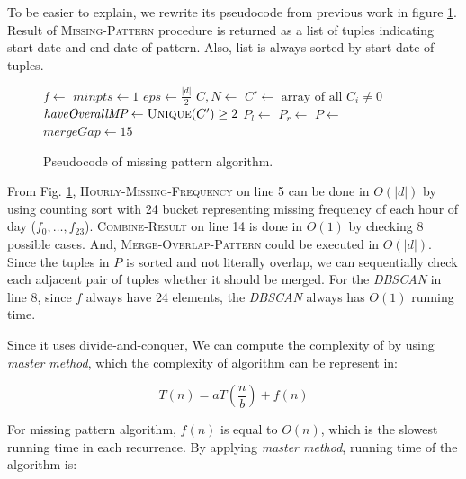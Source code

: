 \documentclass[conference]{IEEEtran}
\begin{document}
To be easier to explain, we rewrite its pseudocode from previous work in figure \ref{fig:missingpattern_pseudocode}. Result of \textsc{Missing-Pattern} procedure is returned as a list of tuples indicating start date and end date of pattern. Also, list is always sorted by start date of tuples.

\begin{figure}
\begin{algorithmic}[1]
\State\Return{$\emptyset$}
\EndIf
\State $f \gets$ 
\State $minpts \gets 1$
\State $eps \gets \frac{|d|}{2}$
\State $C, N \gets$ 
\State $C' \gets \text{ array of all } C_{i} \neq 0$
\State $\textit{haveOverallMP} \gets \Call{Unique}{C'} \ge 2$ 
\State
\State $P_{l} \gets $
\State $P_{r} \gets$ 
\State $P \gets$ 
\State
\State $\textit{mergeGap} \gets 15$ 
\State {}
\EndProcedure
\end{algorithmic}
\caption{Pseudocode of missing pattern algorithm.}
\label{fig:missingpattern_pseudocode}
\end{figure}

From Fig. \ref{fig:missingpattern_pseudocode}, \textsc{Hourly-Missing-Frequency} on line 5 can be done in $O(|d|)$ by using counting sort with 24 bucket representing missing frequency of each hour of day ($f_{0},\ldots,f_{23}$). \textsc{Combine-Result} on line 14 is done in $O(1)$ by checking 8 possible cases. And, \textsc{Merge-Overlap-Pattern} could be executed in $O(|d|)$. Since the tuples in $P$ is sorted and not literally overlap, we can sequentially check each adjacent pair of tuples whether it should be merged. For the \textit{DBSCAN} in line 8, since $f$ always have 24 elements, the \textit{DBSCAN} always has $O(1)$ running time.

Since it uses divide-and-conquer, We can compute the complexity of by using \textit{master method}, which the complexity of algorithm can be represent in:

\[
T(n) = aT(\frac{n}{b}) + f(n)
\]

For missing pattern algorithm, $f(n)$ is equal to $O(n)$, which is the slowest running time in each recurrence. By applying \textit{master method}, running time of the algorithm is:
\end{document}

